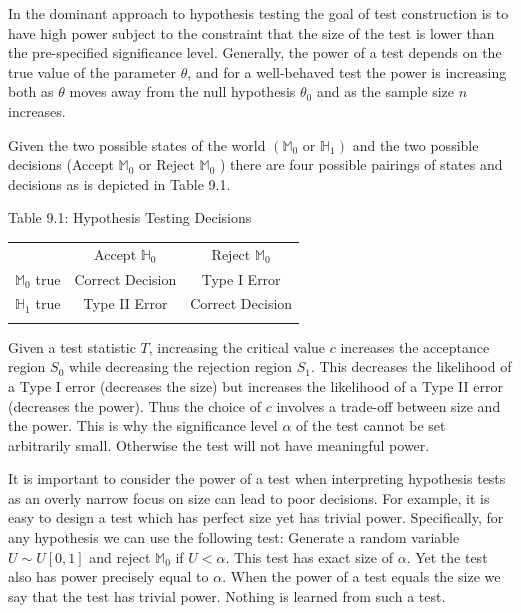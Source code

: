 \documentclass[10pt]{article}
\begin{document}
In the dominant approach to hypothesis testing the goal of test construction is to have high power subject to the constraint that the size of the test is lower than the pre-specified significance level. Generally, the power of a test depends on the true value of the parameter $\theta$, and for a well-behaved test the power is increasing both as $\theta$ moves away from the null hypothesis $\theta_{0}$ and as the sample size $n$ increases.

Given the two possible states of the world $\left(\mathbb{M}_{0}\right.$ or $\left.\mathbb{H}_{1}\right)$ and the two possible decisions (Accept $\mathbb{M}_{0}$ or Reject $\mathbb{M}_{0}$ ) there are four possible pairings of states and decisions as is depicted in Table 9.1.

Table 9.1: Hypothesis Testing Decisions

\begin{tabular}{c|c|c|}
 & \multicolumn{1}{c}{Accept $\mathbb{H}_{0}$} & \multicolumn{1}{c}{Reject $\mathbb{M}_{0}$} \\
\cline { 2 - 3 }
$\mathbb{M}_{0}$ true & Correct Decision & Type I Error \\
\cline { 2 - 3 }
$\mathbb{H}_{1}$ true & Type II Error & Correct Decision \\
\cline { 2 - 3 }
 &  &  \\
\cline { 2 - 3 }
\end{tabular}

Given a test statistic $T$, increasing the critical value $c$ increases the acceptance region $S_{0}$ while decreasing the rejection region $S_{1}$. This decreases the likelihood of a Type I error (decreases the size) but increases the likelihood of a Type II error (decreases the power). Thus the choice of $c$ involves a trade-off between size and the power. This is why the significance level $\alpha$ of the test cannot be set arbitrarily small. Otherwise the test will not have meaningful power.

It is important to consider the power of a test when interpreting hypothesis tests as an overly narrow focus on size can lead to poor decisions. For example, it is easy to design a test which has perfect size yet has trivial power. Specifically, for any hypothesis we can use the following test: Generate a random variable $U \sim U[0,1]$ and reject $\mathbb{M}_{0}$ if $U<\alpha$. This test has exact size of $\alpha$. Yet the test also has power precisely equal to $\alpha$. When the power of a test equals the size we say that the test has trivial power. Nothing is learned from such a test.
\end{document}
